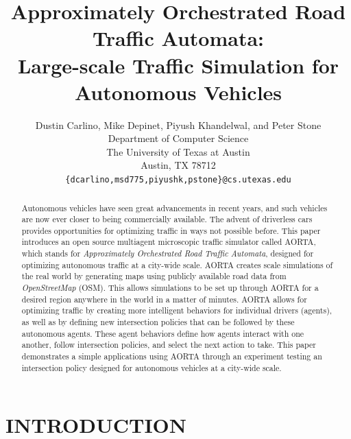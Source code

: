 \documentclass[letterpaper, 10 pt, conference]{ieeeconf}  %
\title{\LARGE \bf
Approximately Orchestrated Road Traffic Automata:\\
Large-scale Traffic Simulation for Autonomous Vehicles
}
\author{Dustin Carlino, Mike Depinet, Piyush Khandelwal, and Peter Stone\\
        Department of Computer Science\\
        The University of Texas at Austin\\
        Austin, TX 78712\\
        {\tt \small\{dcarlino,msd775,piyushk,pstone\}@cs.utexas.edu}}
\begin{document}
\maketitle
\thispagestyle{empty}
\pagestyle{empty}


\begin{abstract} 

Autonomous vehicles have seen great advancements in recent years, and such
vehicles are now ever closer to being commercially available.  The advent of
driverless cars provides opportunities for optimizing traffic in ways not
possible before. This paper introduces an open source multiagent microscopic
traffic simulator called AORTA, which stands for \textit{Approximately
Orchestrated Road Traffic Automata}, designed for optimizing autonomous traffic
at a city-wide scale. AORTA creates scale simulations of the real world by
generating maps using publicly available road data from \textit{OpenStreetMap}
(OSM). This allows simulations to be set up through AORTA for a desired region
anywhere in the world in a matter of minutes. AORTA allows for optimizing
traffic by creating more intelligent behaviors for individual drivers (agents),
as well as by defining new intersection policies that can be followed by these
autonomous agents. These agent behaviors define how agents interact with one
another, follow intersection policies, and select the next action to take. This
paper demonstrates a simple applications using AORTA through an experiment
testing an intersection policy designed for autonomous vehicles at a city-wide
scale.

\end{abstract}


\section{INTRODUCTION}
\label{sec:introduction}

\end{document}
